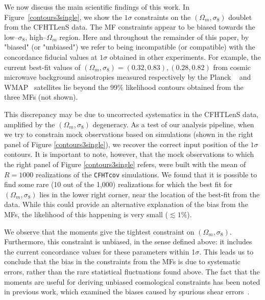 \documentclass[reprint,aps,prd,superscriptaddress,showkeys,showpacs]{revtex4-1}
\begin{document}
We now discuss the main scientific findings of this work. In
Figure~\ref{contours3single}, we show the $1\sigma$ constraints on the
$(\Omega_m,\sigma_8)$ doublet from the CFHTLenS data. The MF
constraints appear to be biased towards the low--$\sigma_8$,
high--$\Omega_m$ region. Here and throughout the remainder of this
paper, by "biased" (or "unbiased") we refer to being incompatible (or
compatible) with the concordance fiducial values at $1\sigma$ obtained
in other experiments. For example, the current best-fit values of
$(\Omega_m,\sigma_8)=(0.32,0.83),(0.28,0.82)$ from cosmic microwave background
anisotropies measured respectively by the Planck
~\citep{PlanckXVI2013} and WMAP~\citep{WMAP9} satellites lie beyond the 99\% likelihood
contours obtained from the three MFs (not shown).

This discrepancy may be due to uncorrected systematics in the CFHTLenS
data, amplified by the $(\Omega_m,\sigma_8)$ degeneracy.  As a test of
our analysis pipeline, when we try to constrain mock observations
based on simulations (shown in the
right panel of Figure \ref{contours3single}), we recover the correct
input position of the $1\sigma$ contours.  It is important to note,
however, that the mock observations to which the right panel of Figure
\ref{contours3single} refers, were built with the mean of $R=1000$
realizations of the \texttt{CFHTcov} simulations. We found that it is
possible to find some rare (10 out of the 1,000) realizations for
which the best fit for $(\Omega_m,\sigma_8)$ lies in the lower right
corner, near the location of the best-fit from the data. While this
could provide an alternative explanation of the bias from the MFs, the
likelihood of this happening is very small ($\lesssim1\%$).


We observe that the moments give the tightest constraint on
$(\Omega_m,\sigma_8)$.  Furthermore, this constraint is unbiased, in
the sense defined above: it includes the current concordance values
for these parameters within 1$\sigma$.  This leads us to conclude that
the bias in the constraints from the MFs is due to systematic errors,
rather than the rare statistical fluctuations found above.
The fact that the moments are useful for deriving unbiased
cosmological constraints has been noted in previous work, which
examined the biases caused by spurious shear
errors~\citep{PetriSpurious}.
\end{document}
